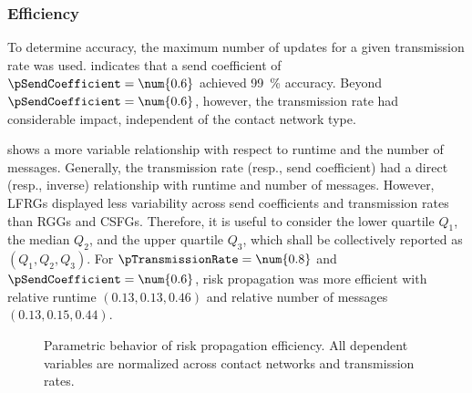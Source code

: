 \subsubsection{Efficiency}

To determine accuracy, the maximum number of updates for a given transmission rate was used.  indicates that a send coefficient of $\pSendCoefficient = \num{0.6}$ achieved \qty{99}{\percent} accuracy. Beyond $\pSendCoefficient = \num{0.6}$, however, the transmission rate had considerable impact, independent of the contact network type.

 shows a more variable relationship with respect to runtime and the number of messages. Generally, the transmission rate (resp., send coefficient) had a direct (resp., inverse) relationship with runtime and number of messages. However, LFRGs displayed less variability across send coefficients and transmission rates than RGGs and CSFGs. Therefore, it is useful to consider the lower quartile $Q_1$, the median $Q_2$, and the upper quartile $Q_3$, which shall be collectively reported as $(Q_1, Q_2, Q_3)$. For $\pTransmissionRate = \num{0.8} $ and $\pSendCoefficient = \num{0.6}$, risk propagation was more efficient with relative runtime $(\num{0.13}, \num{0.13}, \num{0.46})$ and relative number of messages $(0.13, 0.15, 0.44)$.

\begin{figure}[htbp]
\centering
{}
\caption[Parametric behavior of risk propagation efficiency]{Parametric behavior of risk propagation efficiency. All dependent variables are normalized across contact networks and transmission rates.}
\label{fig:efficiency}
\end{figure}

